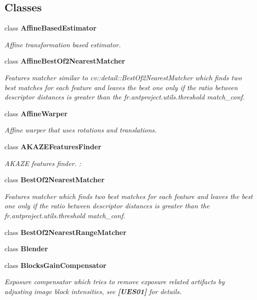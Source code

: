 \subsection*{Classes}
\begin{DoxyCompactItemize}
\item 
class {\bfseries Affine\+Based\+Estimator}
\begin{DoxyCompactList}\small\item\em Affine transformation based estimator. \end{DoxyCompactList}\item 
class {\bfseries Affine\+Best\+Of2\+Nearest\+Matcher}
\begin{DoxyCompactList}\small\item\em Features matcher similar to cv\+::detail\+::\+Best\+Of2\+Nearest\+Matcher which finds two best matches for each feature and leaves the best one only if the ratio between descriptor distances is greater than the fr.antproject.utils.threshold match\+\_\+conf. \end{DoxyCompactList}\item
class {\bfseries Affine\+Warper}
\begin{DoxyCompactList}\small\item\em Affine warper that uses rotations and translations. \end{DoxyCompactList}\item 
class {\bfseries A\+K\+A\+Z\+E\+Features\+Finder}
\begin{DoxyCompactList}\small\item\em A\+K\+A\+ZE features finder. \+: \end{DoxyCompactList}\item 
class {\bfseries Best\+Of2\+Nearest\+Matcher}
\begin{DoxyCompactList}\small\item\em Features matcher which finds two best matches for each feature and leaves the best one only if the ratio between descriptor distances is greater than the fr.antproject.utils.threshold match\+\_\+conf. \end{DoxyCompactList}\item
class {\bfseries Best\+Of2\+Nearest\+Range\+Matcher}
\item 
class {\bfseries Blender}
\item 
class {\bfseries Blocks\+Gain\+Compensator}
\begin{DoxyCompactList}\small\item\em Exposure compensator which tries to remove exposure related artifacts by adjusting image block intensities, see {\bfseries [U\+E\+S01]} for details. \end{DoxyCompactList}\item 

\end{DoxyCompactItemize}
